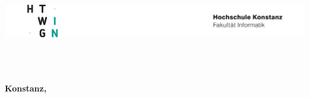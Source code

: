 \begin{titlepage}

\vspace*{-3.5cm}

\begin{flushleft}
\hspace*{-1cm} \includegraphics[width=15.7cm]{front/htwg-logo.png}
\end{flushleft}

\vspace{2.5cm}

\begin{center}
	\huge{
		\textbf{\thema} \\[3cm]
	}
	\Large{
		\textbf{\untertitel}} \\[6.5cm]
	\Large{
		\textbf{\autoren}} \\[3cm]
	\large{
		\textbf{Konstanz, \abgabedatum} \\[1.8cm]
	}
	
	\Huge{
		\textbf{{\sf \arbeitsTyp}}
	}
\end{center}

\end{titlepage}
